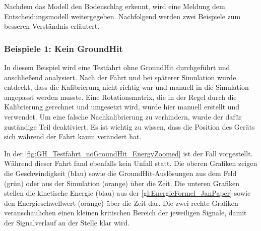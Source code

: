 Nachdem das Modell den Bodenschlag erkennt, wird eine Meldung dem Entscheidungsmodell weitergegeben. Nachfolgend werden zwei Beispiele zum besseren Verständnis erläutert.

\subsubsection{Beispiele 1: Kein GroundHit}
In diesem Beispiel wird eine Testfahrt ohne GroundHit durchgeführt und anschließend analysiert. Nach der Fahrt und bei späterer Simulation wurde entdeckt, dass die Kalibrierung nicht richtig war und manuell in die Simulation angepasst werden musste. Eine Rotationsmatrix, die in der Regel durch die Kalibrierung gerechnet und umgesetzt wird, wurde hier manuell erstellt und verwendet. Um eine falsche Nachkalibrierung zu verhindern, wurde der dafür zuständige Teil deaktiviert. Es ist wichtig zu wissen, dass die Position des Geräts sich während der Fahrt kaum verändert hat.



In der \autoref{fig:GH_Testfahrt_noGroundHit_EnergyZoomed} ist der Fall vorgestellt. Während dieser Fahrt fand ebenfalls kein Unfall statt. 
Die oberen Grafiken zeigen die Geschwindigkeit (blau) sowie die GroundHit-Auslösungen aus dem Feld (grün) oder aus der Simulation (orange) über die Zeit.
Die unteren Grafiken stellen die kinetische Energie (blau) aus der \autoref{gl:EnergieFormel_JanPaper} sowie den Energieschwellwert (orange) über die Zeit dar.
Die zwei rechte Grafiken veranschaulichen einen kleinen kritischen Bereich der jeweiligen Signale, damit der Signalverlauf an der Stelle klar wird.


